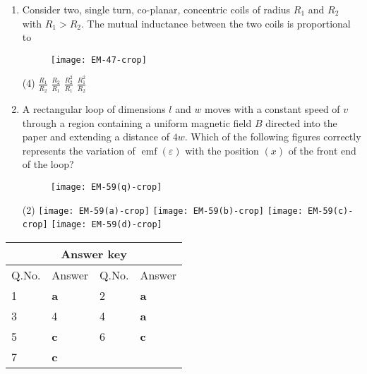 \begin{enumerate}[ label=\color{ocre}\textbf{\arabic*.}]
	\item Consider two, single turn, co-planar, concentric coils of radius $R_{1}$ and $R_{2}$ with $R_{1} > R_{2}$. The mutual inductance between the two coils is proportional to{}
	\begin{figure}[H]
		\begin{center}
			\texttt{[image: EM-47-crop]}
		\end{center}
	\end{figure}
	\begin{tasks}(4)
		\task[\textbf{a.}]$\frac{R_{1}}{R_{2}}$
		\task[\textbf{b.}]$\frac{R_{2}}{R_{1}}$
		\task[\textbf{c.}]$\frac{R_{2}^{2}}{R_{1}}$
		\task[\textbf{d.}]$\frac{R_{1}^{2}}{R_{2}}$
	\end{tasks}
	\item A rectangular loop of dimensions $l$ and $w$ moves with a constant speed of $v$ through a region containing a uniform magnetic field $B$ directed into the paper and extending a distance of $4 w$. Which of the following figures correctly represents the variation of $\operatorname{emf}(\varepsilon)$ with the position $(x)$ of the front end of the loop?{}
	\begin{figure}[H]
		\begin{center}
			\texttt{[image: EM-59(q)-crop]}
		\end{center}
	\end{figure}
	\begin{tasks}(2)
		\task[\textbf{a.}] \texttt{[image: EM-59(a)-crop]}
		\task[\textbf{b.}] \texttt{[image: EM-59(b)-crop]}
		\task[\textbf{c.}] \texttt{[image: EM-59(c)-crop]}
		\task[\textbf{d.}] \texttt{[image: EM-59(d)-crop]}
	\end{tasks}
\end{enumerate}
\setlength\arrayrulewidth{1pt}
\begin{table}[H]
	\centering
	\begin{tabular}{|p{1.5cm}|p{1.5cm}||p{1.5cm}|p{1.5cm}|}
		\hline
		\multicolumn{4}{|c|}{\textbf{Answer key}}\\\hline\hline
		\rowcolor{ocrel}Q.No.&Answer&Q.No.&Answer\\\hline
		1&\textbf{a} &2&\textbf{a}\\\hline 
		3&4 &4&\textbf{a} \\\hline
		5&\textbf{c} &6&\textbf{c} \\\hline
		7&\textbf{c}& &\\\hline
		
	\end{tabular}
\end{table}
